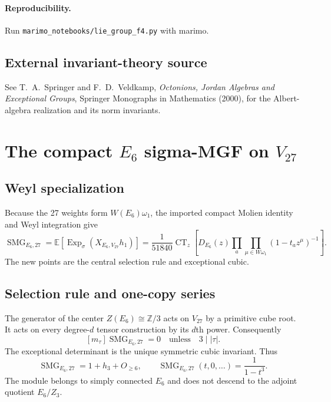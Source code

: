 \documentclass[10pt]{article}
\newcommand{\CT}{\operatorname{CT}}
\newcommand{\ExpS}{\operatorname{Exp}_{\sigma}}
\newcommand{\SMG}{\operatorname{SMG}}
\newcommand{\smgv}[2]{\mathbb E\!\left[\ExpS\!\left(X_{#1,#2}h_1\right)\right]}
\begin{document}
\paragraph{Reproducibility.} Run \texttt{marimo\_notebooks/lie\_group\_f4.py} with marimo.
\subsection*{External invariant-theory source}
See T.~A.~Springer and F.~D.~Veldkamp, \emph{Octonions, Jordan Algebras and
Exceptional Groups}, Springer Monographs in Mathematics (2000), for the
Albert-algebra realization and its norm invariants.
\endgroup


\clearpage
\section[The compact E6 sigma-MGF on V27]{The compact $E_6$ sigma-MGF on $V_{27}$}\label{proof:e6}
\begingroup
{}
\providecommand{\Sg}{\SMG}
\renewcommand{\Sg}{\SMG}
\providecommand{\CT}{\operatorname{CT}}
\renewcommand{\CT}{\operatorname{CT}}
\setcounter{theorem}{0}
\setcounter{proposition}{0}
\setcounter{lemma}{0}
\setcounter{corollary}{0}
\setcounter{remark}{0}
\begin{abstract}
For simply connected compact $E_6$ and its minuscule 27-dimensional module,
we prove the constant-term formula, the mod-three selection rule, and the
initial expansion $1+h_3+O_{\ge6}$.  An exact 27-weight computation verifies
all Schur coefficients through degree three.
\end{abstract}

\subsection{Weyl specialization}
Because the 27 weights form $W(E_6)\omega_1$, the imported compact Molien
identity and Weyl integration give
\[
\boxed{\Sg_{E_6,27}=\smgv{E_6}{V_{27}}
=\frac1{51840}\CT_z\!\left[D_{E_6}(z)
\prod_a\prod_{\mu\in W\omega_1}(1-t_a z^\mu)^{-1}\right].}
\]
The new points are the central selection rule and exceptional cubic.

\subsection{Selection rule and one-copy series}
The generator of the center $Z(E_6)\cong\mathbb Z/3$ acts on $V_{27}$ by a
primitive cube root.  It acts on every degree-$d$ tensor construction by its
$d$th power.  Consequently
\[
 [m_\tau]\Sg_{E_6,27}=0\quad\text{unless}\quad 3\mid |\tau|.
\]
The exceptional determinant is the unique symmetric cubic invariant.  Thus
\[
 \boxed{\Sg_{E_6,27}=1+h_3+O_{\ge6}},\qquad
 \boxed{\Sg_{E_6,27}(t,0,\ldots)=\frac1{1-t^3}}.
\]
The module belongs to simply connected $E_6$ and does not descend to the
adjoint quotient $E_6/Z_3$.
\end{document}
